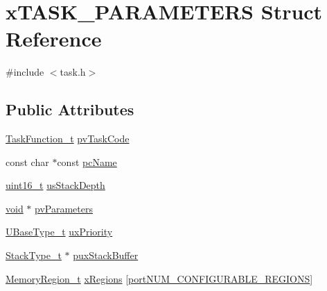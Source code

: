\hypertarget{structx_t_a_s_k___p_a_r_a_m_e_t_e_r_s}{}\section{x\+T\+A\+S\+K\+\_\+\+P\+A\+R\+A\+M\+E\+T\+E\+RS Struct Reference}
\label{structx_t_a_s_k___p_a_r_a_m_e_t_e_r_s}


{\ttfamily \#include $<$task.\+h$>$}

\subsection*{Public Attributes}
\begin{DoxyCompactItemize}
\item 
\hyperlink{projdefs_8h_a9b32502ff92c255c686dacde53c1cba0}{Task\+Function\+\_\+t} \hyperlink{structx_t_a_s_k___p_a_r_a_m_e_t_e_r_s_a7527993402054565cda38251c8922880}{pv\+Task\+Code}
\item 
const char $\ast$const \hyperlink{structx_t_a_s_k___p_a_r_a_m_e_t_e_r_s_a7b3e5583acf9de8bacac572a42246459}{pc\+Name}
\item 
\hyperlink{_p_e___types_8h_a1f1825b69244eb3ad2c7165ddc99c956}{uint16\+\_\+t} \hyperlink{structx_t_a_s_k___p_a_r_a_m_e_t_e_r_s_aa07bfb2214d78ba7a30592fa7b75af18}{us\+Stack\+Depth}
\item 
\hyperlink{usb__devapi_8h_afabf60e7f57651d6d595a02c75f07cd0}{void} $\ast$ \hyperlink{structx_t_a_s_k___p_a_r_a_m_e_t_e_r_s_accbb9f4de75b5b5be750198b52390c7f}{pv\+Parameters}
\item 
\hyperlink{_g_c_c_2_a_r_m___c_m3_2portmacro_8h_a646f89d4298e4f5afd522202b11cb2e6}{U\+Base\+Type\+\_\+t} \hyperlink{structx_t_a_s_k___p_a_r_a_m_e_t_e_r_s_aa1aff14035db645e2bdcc85b3cdc9bab}{ux\+Priority}
\item 
\hyperlink{_g_c_c_2_a_r_m___c_m3_2portmacro_8h_a84e9a8ba132feed0b2401c1f4e2ac63c}{Stack\+Type\+\_\+t} $\ast$ \hyperlink{structx_t_a_s_k___p_a_r_a_m_e_t_e_r_s_a946c525d3765369780538f9bc3f3586d}{pux\+Stack\+Buffer}
\item 
\hyperlink{task_8h_af609504de4d78ff6f71477ae47c66e51}{Memory\+Region\+\_\+t} \hyperlink{structx_t_a_s_k___p_a_r_a_m_e_t_e_r_s_ae8b97c6b7a344bf09b066b0844844d66}{x\+Regions} \mbox{[}\hyperlink{portable_8h_aca7e1a8a568a38b74cc9db10c8efebda}{port\+N\+U\+M\+\_\+\+C\+O\+N\+F\+I\+G\+U\+R\+A\+B\+L\+E\+\_\+\+R\+E\+G\+I\+O\+NS}\mbox{]}
\end{DoxyCompactItemize}


